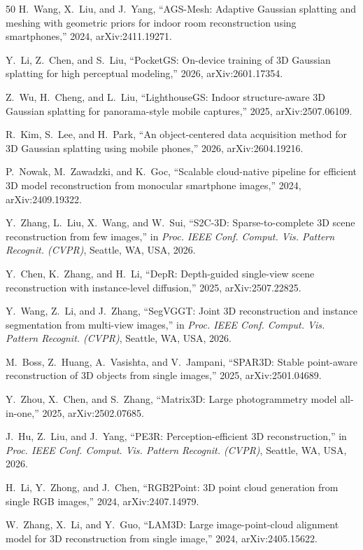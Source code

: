 \documentclass[journal]{IEEEtran}
\begin{document}
\begin{thebibliography}{50}
 H.~Wang, X.~Liu, and J.~Yang, ``AGS-Mesh: Adaptive Gaussian splatting and meshing with geometric priors for indoor room reconstruction using smartphones,'' 2024, arXiv:2411.19271.

 Y.~Li, Z.~Chen, and S.~Liu, ``PocketGS: On-device training of 3D Gaussian splatting for high perceptual modeling,'' 2026, arXiv:2601.17354.

 Z.~Wu, H.~Cheng, and L.~Liu, ``LighthouseGS: Indoor structure-aware 3D Gaussian splatting for panorama-style mobile captures,'' 2025, arXiv:2507.06109.

 R.~Kim, S.~Lee, and H.~Park, ``An object-centered data acquisition method for 3D Gaussian splatting using mobile phones,'' 2026, arXiv:2604.19216.

 P.~Nowak, M.~Zawadzki, and K.~Goc, ``Scalable cloud-native pipeline for efficient 3D model reconstruction from monocular smartphone images,'' 2024, arXiv:2409.19322.

 Y.~Zhang, L.~Liu, X.~Wang, and W.~Sui, ``S2C-3D: Sparse-to-complete 3D scene reconstruction from few images,'' in \textit{Proc. IEEE Conf. Comput. Vis. Pattern Recognit. (CVPR)}, Seattle, WA, USA, 2026.

 Y.~Chen, K.~Zhang, and H.~Li, ``DepR: Depth-guided single-view scene reconstruction with instance-level diffusion,'' 2025, arXiv:2507.22825.

 Y.~Wang, Z.~Li, and J.~Zhang, ``SegVGGT: Joint 3D reconstruction and instance segmentation from multi-view images,'' in \textit{Proc. IEEE Conf. Comput. Vis. Pattern Recognit. (CVPR)}, Seattle, WA, USA, 2026.

 M.~Boss, Z.~Huang, A.~Vasishta, and V.~Jampani, ``SPAR3D: Stable point-aware reconstruction of 3D objects from single images,'' 2025, arXiv:2501.04689.

 Y.~Zhou, X.~Chen, and S.~Zhang, ``Matrix3D: Large photogrammetry model all-in-one,'' 2025, arXiv:2502.07685.

 J.~Hu, Z.~Liu, and J.~Yang, ``PE3R: Perception-efficient 3D reconstruction,'' in \textit{Proc. IEEE Conf. Comput. Vis. Pattern Recognit. (CVPR)}, Seattle, WA, USA, 2026.

 H.~Li, Y.~Zhong, and J.~Chen, ``RGB2Point: 3D point cloud generation from single RGB images,'' 2024, arXiv:2407.14979.

 W.~Zhang, X.~Li, and Y.~Guo, ``LAM3D: Large image-point-cloud alignment model for 3D reconstruction from single image,'' 2024, arXiv:2405.15622.


\end{thebibliography}
\end{document}
